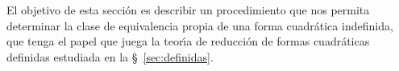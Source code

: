 \theoremstyle{plain}
\newtheorem{teoIndefinidas}{\teoname}[section]
\newtheorem{lemaIndefinidas}[teoIndefinidas]{\lemaname}

\theoremstyle{definition}
\newtheorem{defIndefinidas}[teoIndefinidas]{}
\newtheorem{ejemIndefinidas}[teoIndefinidas]{\ejemname}


El objetivo de esta secci\'on es describir un procedimiento que nos permita
determinar la clase de equivalencia propia de una forma cuadr\'atica
indefinida, que tenga el papel que juega la teor\'{\i}a de reducci\'on
de formas cuadr\'aticas definidas estudiada en la \S~\ref{sec:definidas}.

